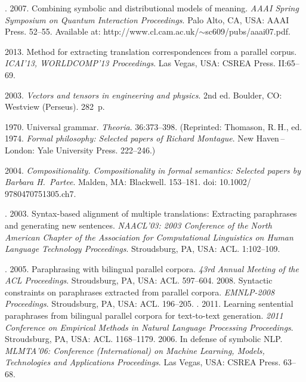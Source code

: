 \begin{multicols}{2}
{{\begin{thebibliography}{99}
. 2007. 
Combining symbolic and distributional models of meaning. 
\textit{AAAI Spring Symposium on Quantum Interaction Proceedings}. 
Palo Alto, CA, USA: AAAI Press. 52--55. 
Available at: {\sf http://www.cl.cam.ac.uk/$\sim$sc609/pubs/aaai07.pdf}.

 2013. Method for extracting translation correspondences from a 
parallel corpus. \textit{ICAI'13, WORLDCOMP'13 Proceedings}. 
Las Vegas, USA: CSREA Press. II:65--69.


 2003. \textit{Vectors and tensors in engineering and physics}. 2nd ed.  
Boulder, CO: Westview (Perseus). 282~p. 

 1970. Universal grammar. \textit{Theoria}.  36:373--398. 
(Reprinted: Thomason, R.\,H., ed. 1974. \textit{Formal philosophy: Selected papers of Richard Montague}. 
 New Haven\,--\,London: Yale University Press. 222--246.)
 
 \columnbreak
 
 2004. \textit{Compositionality. Compositionality in formal semantics: 
Selected papers by Barbara H.~Partee}. Malden, MA: Blackwell. 153--181. 
doi: 10.1002/ 9780470751305.ch7.

. 
2003. Syntax-based alignment of multiple translations: Extracting paraphrases and 
generating new sentences. \textit{NAACL'03: 2003 Conference of the North American 
Chapter of the Association for Computational Linguistics on Human Language Technology
Proceedings}. Stroudsburg, PA, USA: ACL. 1:102--109.

. 
2005.  Paraphrasing with bilingual parallel corpora. 
\textit{43rd Annual Meeting of the ACL  Proceedings}.
Stroudsburg, PA, USA: ACL. 597--604.
 2008. Syntactic constraints on paraphrases extracted 
from parallel corpora. \textit{EMNLP-2008 Proceedings}. Stroudsburg, PA, USA: ACL. 196--205.
. 
2011. Learning sentential paraphrases from bilingual parallel corpora for text-to-text 
generation. \textit{2011 Conference on Empirical Methods in Natural Language Processing
Proceedings}. Stroudsburg, PA, USA: ACL. 1168--1179.
 2006.  In defense of symbolic NLP. 
\textit{MLMTA'06: Conference (International) on Machine Learning, Models,
 Technologies and Applications Proceedings}. Las Vegas, USA: CSREA Press. 63--68.


\end{thebibliography}}}
\end{multicols}
